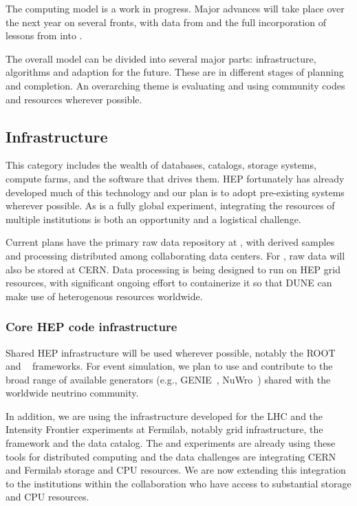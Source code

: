 The   computing model is a work in progress.  Major advances will take place over the next year on several fronts, with data from  and the full incorporation of lessons from   into  . 


The overall model can be divided into several major parts:  infrastructure, algorithms and adaption for the future.  These are in different stages of planning and completion.  An overarching theme is evaluating and using community codes and resources wherever possible. 



\subsection{Infrastructure}
This category includes the wealth of databases, catalogs, storage systems, compute farms, and the software that drives them.  HEP fortunately has already developed much of this technology and our plan is to adopt pre-existing systems wherever possible.  As   is a fully global experiment, integrating the resources of multiple institutions is both an opportunity and a logistical challenge.

Current plans have the primary raw data repository at \fnal, with derived samples and processing distributed among collaborating data centers.  For , raw data will also be stored at CERN.  Data processing is being designed to run on HEP grid resources, with significant ongoing effort to containerize it so that DUNE can make use of heterogenous resources worldwide. 


\subsubsection{Core HEP code infrastructure}
Shared HEP infrastructure will be used wherever possible, notably the ROOT\cite{root} and ~\cite{geant4,Allison:2006ve} frameworks.   For event simulation, we plan to use and contribute to  the broad range of available generators (e.g., GENIE~\cite{Andreopoulos:2009rq}, NuWro~\cite{NuWro2012}) shared with the worldwide neutrino community.

In addition, we are using the infrastructure developed for the LHC and the Intensity Frontier experiments at Fermilab, notably grid infrastructure,  the  framework and the  data catalog.  The  and  experiments are already using these tools for distributed computing and the  data challenges are integrating CERN and Fermilab storage and CPU resources.  We are now extending this integration to the  institutions within the collaboration who have access to substantial storage and CPU resources. 



